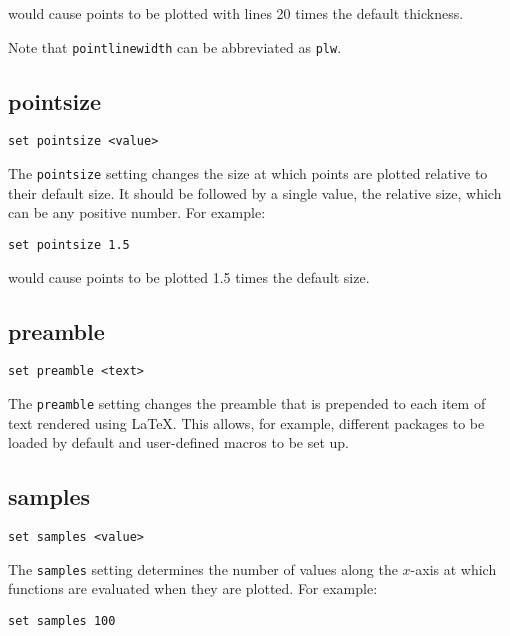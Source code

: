 \noindent would cause points to be plotted with lines 20 times the default thickness.

Note that {\tt pointlinewidth} can be abbreviated as {\tt plw}.

\subsection{pointsize}

\begin{verbatim}
set pointsize <value>
\end{verbatim}

The {\tt pointsize} setting changes the size at which points are plotted
relative to their default size. It should be followed by a single value, the
relative size, which can be any positive number. For example:

\begin{verbatim}
set pointsize 1.5
\end{verbatim}

\noindent would cause points to be plotted 1.5 times the default size.

\subsection{preamble}

\begin{verbatim}
set preamble <text>
\end{verbatim}

The {\tt preamble} setting changes the preamble that is prepended to each item of
text rendered using \LaTeX{}.  This allows, for example, different packages to
be loaded by default and user-defined macros to be set up.

\subsection{samples}

\begin{verbatim}
set samples <value>
\end{verbatim}

The {\tt samples} setting determines the number of values along the $x$-axis at
which functions are evaluated when they are plotted. For example:

\begin{verbatim}
set samples 100
\end{verbatim}

